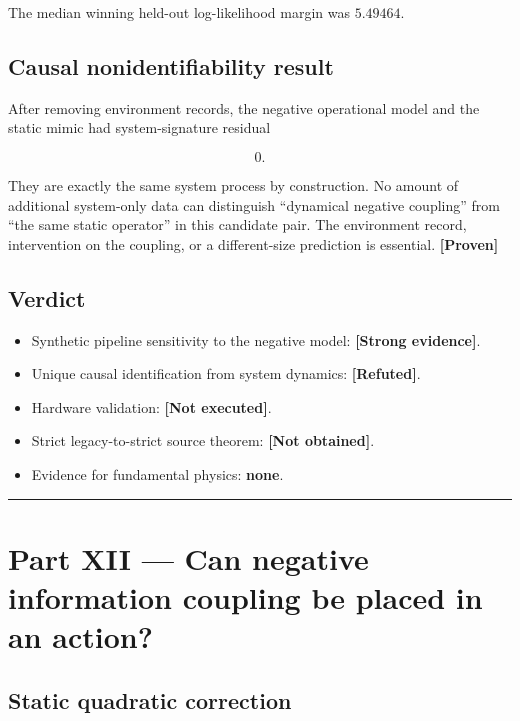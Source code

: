 \documentclass[11pt,a4paper,openany]{report}
\newcommand{\statusProven}{\textcolor{fingreen}{[Proven]}}
\newcommand{\statusStrong}{\textcolor{finblue}{[Strong evidence]}}
\newcommand{\statusRefuted}{\textcolor{finred}{[Refuted]}}
\begin{document}
The median winning held-out log-likelihood margin was \(5.49464\).

\section{Causal nonidentifiability result}

After removing environment records, the negative operational model and the static mimic had system-signature residual

\[
0.
\]

They are exactly the same system process by construction. No amount of additional system-only data can distinguish “dynamical negative coupling” from “the same static operator” in this candidate pair. The environment record, intervention on the coupling, or a different-size prediction is essential. \textbf{\statusProven{}}

\section{Verdict}

\begin{itemize}
\item 
Synthetic pipeline sensitivity to the negative model: \textbf{\statusStrong{}}.

\item 
Unique causal identification from system dynamics: \textbf{\statusRefuted{}}.

\item 
Hardware validation: \textbf{[Not executed]}.

\item 
Strict legacy-to-strict source theorem: \textbf{[Not obtained]}.

\item 
Evidence for fundamental physics: \textbf{none}.

\end{itemize}

\par\medskip\hrule\medskip

\chapter{Part XII — Can negative information coupling be placed in an action?}

\section{Static quadratic correction}
\end{document}
